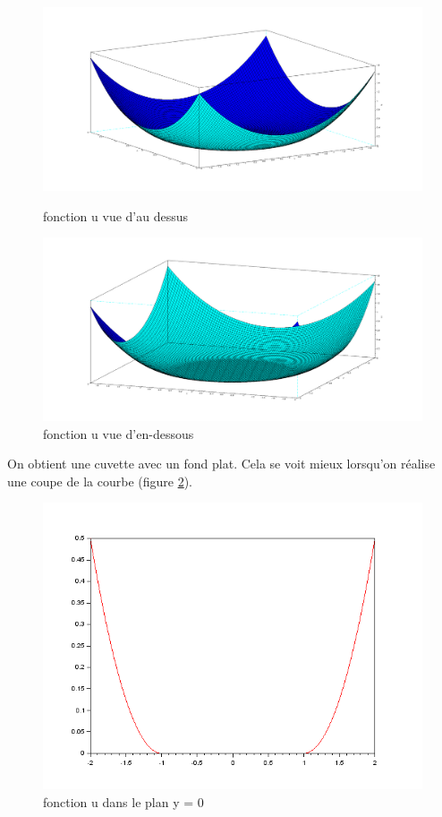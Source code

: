 \documentclass[12pt,a4paper,twoside]{article}
\begin{document}
\begin{figure}[!h]
\begin{center}
\includegraphics[scale=0.25]{Images/fig1.png}
\caption{fonction u vue d'au dessus}
\includegraphics[scale=0.25]{Images/fig0.png}
\caption{fonction u vue d'en-dessous}
\label{fonctionu}
\end{center}
\end{figure}

On obtient une cuvette avec un fond plat. Cela se voit mieux lorsqu'on réalise une coupe de la courbe (figure \ref{coupeu}).


\begin{figure}[!h]
\begin{center}
\includegraphics[scale=0.5]{Images/fig3.png}
\caption{fonction u dans le plan y = 0}
\label{coupeu}
\end{center}
\end{figure}
\end{document}
